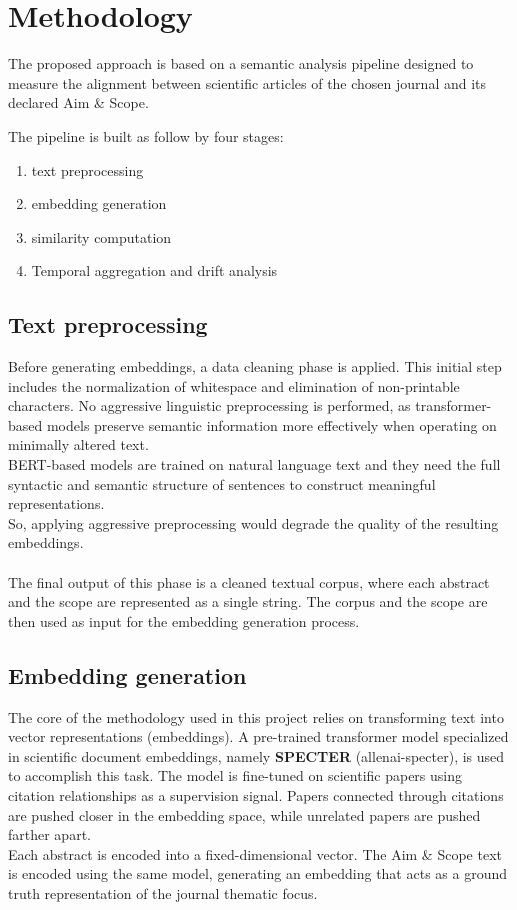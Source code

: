 \documentclass[pdflatex,sn-mathphys-num]{sn-jnl}%
\theoremstyle{thmstyleone}%
\theoremstyle{thmstyletwo}%
\theoremstyle{thmstylethree}%
\begin{document}
\section{Methodology}\label{sec3}

The proposed approach is based on a semantic analysis pipeline designed to measure the alignment between scientific articles of the chosen journal and its declared Aim \& Scope.


The pipeline is built as follow by four stages:
\begin{enumerate}
\item text preprocessing
\item embedding generation
\item similarity computation
\item Temporal aggregation and drift analysis
\end{enumerate}

\subsection{Text preprocessing}\label{subsec2}

Before generating embeddings, a data cleaning phase is applied. This initial step includes the normalization of whitespace and elimination of non-printable characters. No aggressive linguistic preprocessing is performed, as transformer-based models preserve semantic information more effectively when operating on minimally altered text.\\
BERT-based models are trained on natural language text and they need the full syntactic and semantic structure of sentences to construct meaningful representations.\\
So, applying aggressive preprocessing would degrade the quality of the resulting embeddings.\\\\
The final output of this phase is a cleaned textual corpus, where each abstract and the scope are represented as a single string. The corpus and the scope are then used as input for the embedding generation process.

\subsection{Embedding generation}\label{subsec2}

The core of the methodology used in this project relies on transforming text into vector representations (embeddings).
A pre-trained transformer model specialized in scientific document embeddings, namely \textbf{SPECTER} (allenai-specter), is used to accomplish this task. The model is fine-tuned on scientific papers using citation relationships as a supervision signal. Papers connected through citations are pushed closer in the embedding space, while unrelated papers are pushed farther apart. \\
Each abstract is encoded into a fixed-dimensional vector. The Aim \& Scope text is encoded using the same model, generating an embedding that acts as a ground truth representation of the journal thematic focus.
\end{document}
